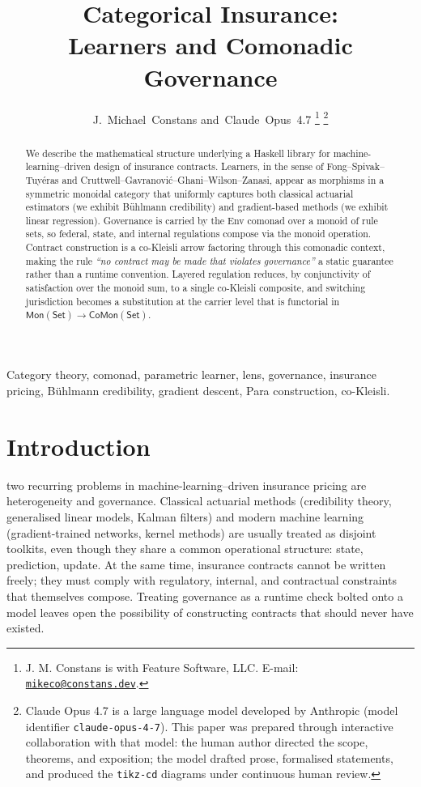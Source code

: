 \documentclass[journal,10pt]{IEEEtran}
\title{Categorical Insurance: \\ Learners and Comonadic Governance}
\author{%
  J.~Michael~Constans
  and~Claude~Opus~4.7%
  \thanks{J. M. Constans is with Feature Software, LLC. E-mail:
  \href{mailto:mikeco@constans.dev}{\texttt{mikeco@constans.dev}}.}%
  \thanks{Claude Opus 4.7 is a large language model developed by
  Anthropic (model identifier \texttt{claude-opus-4-7}). This paper was
  prepared through interactive collaboration with that model:
  the human author directed the scope, theorems, and exposition; the
  model drafted prose, formalised statements, and produced the
  \texttt{tikz-cd} diagrams under continuous human review.}%
}
\theoremstyle{plain}
\theoremstyle{definition}
\theoremstyle{remark}
\newcommand{\Set}{\mathsf{Set}}
\newcommand{\Mon}{\mathsf{Mon}}
\newcommand{\CoMon}{\mathsf{CoMon}}
\begin{document}
\maketitle

\begin{abstract}
We describe the mathematical structure underlying a Haskell library
for machine-learning--driven design of insurance contracts. Learners,
in the sense of Fong--Spivak--Tuy\'eras and
Cruttwell--Gavranovi\'c--Ghani--Wilson--Zanasi, appear as morphisms in
a symmetric monoidal category that uniformly captures both classical
actuarial estimators (we exhibit B\"uhlmann credibility) and
gradient-based methods (we exhibit linear regression). Governance is
carried by the Env comonad over a monoid of rule sets, so federal,
state, and internal regulations compose via the monoid operation.
Contract construction is a co-Kleisli arrow factoring through this
comonadic context, making the rule \emph{``no contract may be made
that violates governance''} a static guarantee rather than a runtime
convention. Layered regulation reduces, by conjunctivity of
satisfaction over the monoid sum, to a single co-Kleisli composite,
and switching jurisdiction becomes a substitution at the carrier
level that is functorial in $\Mon(\Set) \to \CoMon(\Set)$.
\end{abstract}

\begin{IEEEkeywords}
Category theory, comonad, parametric learner, lens, governance,
insurance pricing, B\"uhlmann credibility, gradient descent, Para
construction, co-Kleisli.
\end{IEEEkeywords}

\section{Introduction}
\label{sec:intro}

 two recurring problems in
machine-learning--driven insurance pricing are heterogeneity and
governance. Classical actuarial methods (credibility theory,
generalised linear models, Kalman filters) and modern machine learning
(gradient-trained networks, kernel methods) are usually treated as
disjoint toolkits, even though they share a common operational
structure: state, prediction, update. At the same time, insurance
contracts cannot be written freely; they must comply with regulatory,
internal, and contractual constraints that themselves compose.
Treating governance as a runtime check bolted onto a model leaves
open the possibility of constructing contracts that should never have
existed.
\end{document}

